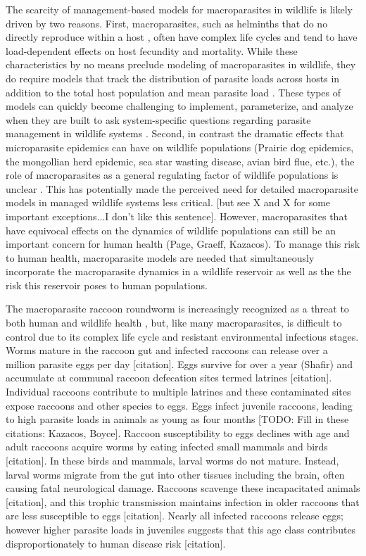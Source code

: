 \documentclass[11pt]{article}
\begin{document}
The scarcity of management-based models for macroparasites in wildlife is likely driven by two reasons. First, macroparasites, such as helminths that do no directly reproduce within a host \citep{AndersonandMay1979}, often have complex life cycles and tend to have load-dependent effects on host fecundity and mortality. While these characteristics by no means preclude modeling of macroparasites in wildlife, they do require models that track the distribution of parasite loads across hosts in addition to the total host population and mean parasite load \citep{AndersonandMay1978}.  These types of models can quickly become challenging to implement, parameterize, and analyze when they are built to ask system-specific questions regarding parasite management in wildlife systems \citep{McCallum2017}.  Second, in contrast the dramatic effects that microparasite epidemics can have on wildlife populations (Prairie dog epidemics, the mongollian herd epidemic, sea star wasting disease, avian bird flue, etc.), the role of macroparasites as a general regulating factor of wildlife populations is unclear \citep{Tompkins2002,Tompkins2011}. This has potentially made the perceived need for detailed macroparasite models in managed wildlife systems less critical. [but see X and X for some important exceptions...I don't like this sentence]. However, macroparasites that have equivocal effects on the dynamics of wildlife populations can still be an important concern for human health (Page, Graeff, Kazacos).  To manage this risk to human health, macroparasite models are needed that simultaneously incorporate the macroparasite dynamics in a wildlife reservoir as well as the the risk this reservoir poses to human populations.  

The macroparasite raccoon roundworm is increasingly recognized as a threat to both human
and wildlife health \citep{Page2011,Weinstein2017}, but, like many
macroparasites, is difficult to control due to its complex life cycle
and resistant environmental infectious stages. Worms mature in the
raccoon gut and infected raccoons can release over a million parasite
eggs per day [citation]. Eggs survive for over a year (Shafir) and accumulate at
communal raccoon defecation sites termed latrines [citation]. Individual
raccoons contribute to multiple latrines and these contaminated sites
expose raccoons and other species to eggs. Eggs infect juvenile
raccoons, leading to high parasite loads in animals as young as four
months \citep{Weinstein2016} [TODO: Fill in these citations: Kazacos, Boyce]. Raccoon susceptibility to eggs
declines with age and adult raccoons acquire worms by eating infected
small mammals and birds [citation]. In these birds and mammals, larval worms do
not mature. Instead, larval worms migrate from the gut into other
tissues including the brain, often causing fatal neurological damage.
Raccoons scavenge these incapacitated animals [citation], and this trophic
transmission maintains infection in older raccoons that are less
susceptible to eggs [citation]. Nearly all infected raccoons release eggs;
however higher parasite loads in juveniles suggests that this age class
contributes disproportionately to human disease risk [citation].
\end{document}
